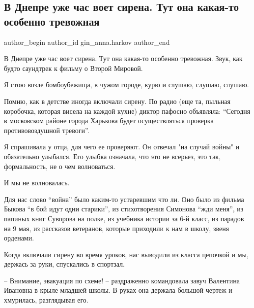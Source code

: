  
 
 
 
 
 
\subsection{В Днепре уже час воет сирена. Тут она какая-то особенно тревожная}
\label{sec:07_04_2022.fb.gin_anna.harkov.1.dnepr_sirena}
 
\ifcmt
 author_begin
   author_id gin_anna.harkov
 author_end
\fi

В Днепре уже час воет сирена. Тут она какая-то особенно тревожная. Звук, как
будто саундтрек к фильму о Второй Мировой. 

Я стою возле бомбоубежища, в чужом городе, курю и слушаю, слушаю, слушаю. 

Помню, как в детстве иногда включали сирену. По радио (еще та, пыльная
коробочка, которая висела на каждой кухне) диктор пафосно объявляла: \enquote{Сегодня в
московском районе города Харькова будет осуществляться  проверка
противовоздушной тревоги}. 

Я спрашивала у отца, для чего ее проверяют. Он отвечал "на случай войны" и
обязательно улыбался. Его улыбка означала, что это не всерьез, это так,
формальность, не о чем волноваться.  

И мы не волновалась. 

Для нас слово \enquote{война} было каким-то устаревшим что ли. Оно было из фильма
Быкова \enquote{в бой идут одни старики}, из стихотворения Симонова \enquote{жди меня}, из
папиных книг Суворова на полке, из учебника истории за 6-й класс, из парадов на
9 мая, из рассказов ветеранов, которые приходили к нам в школу, звеня орденами. 

Когда включали сирену во время уроков, нас выводили из класса цепочкой и мы,
держась за руки, спускались в спортзал.

– Внимание, эвакуация по схеме! – раздраженно командовала завуч Валентина
Ивановна в крыле младшей школы. В руках она держала большой  чертеж и
хмурилась, разглядывая его. 

